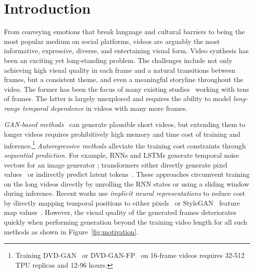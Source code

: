 
\section{Introduction}

From conveying emotions that break language and cultural barriers to being the most popular medium on social platforms, videos are arguably the most informative, expressive, diverse, and entertaining visual form.
Video synthesis has been an exciting yet long-standing problem.
The challenges include not only achieving high visual quality in each frame and a natural transitions between frames, but
a consistent theme, and even a meaningful storyline throughout the video. 
The former has been the focus of many existing studies~\cite{vondrick2016generating,saito2017temporal,clark2019adversarial,tian2021a,yan2021videogpt} working with tens of frames. 
The latter is largely unexplored and requires the ability to model \emph{long-range temporal dependence} in videos with many more frames.

\emph{GAN-based methods}~\cite{vondrick2016generating,saito2017temporal,clark2019adversarial,luc2020transformation} can generate plausible short videos, but extending them to longer videos requires prohibitively high memory and time cost of training and inference.\footnote{Training DVD-GAN~\cite{clark2019adversarial} or DVD-GAN-FP~\cite{luc2020transformation} on 16-frame videos requires 32-512 TPU replicas and 12-96 hours.}
\emph{Autoregressive methods} alleviate the training cost constraints through \emph{sequential prediction}. 
For example, RNNs and LSTMs generate temporal noise vectors for an image generator \cite{saito2017temporal,Tulyakov_2018_CVPR,clark2019adversarial,saito2020train,munoz2021temporal,tian2021a};
 transformers either directly generate pixel values~\cite{kalchbrenner2017video,Weissenborn2020Scaling} or indirectly predict latent tokens~\cite{van2017neural,esser2021taming,rakhimov2020latent,wu2021n,le2021ccvs,yan2021videogpt}.
These approaches circumvent training on the long videos directly by unrolling the RNN states or using a sliding window during inference. Recent works use \emph{implicit neural representations} to reduce cost by directly mapping temporal positions to either pixels~\cite{yu2021generating} or StyleGAN~\cite{karras2020analyzing} feature map values~\cite{skorokhodov2021stylegan}. 
However, the visual quality of the generated frames deteriorates quickly when performing generation beyond the training video length for all such methods as shown in Figure~\ref{fig:motivation}.


